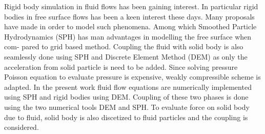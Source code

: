 \begin{Abstract}
Rigid body simulation in fluid flows has been gaining interest. In particular rigid
bodies in free surface flows has been a keen interest these days. Many proposals
have made in order to model such phenomena. Among which Smoothed Particle
Hydrodynamics (SPH) has man advantages in modelling the free surface when com-
pared to grid based method. Coupling the fluid with solid body is also seamlessly
done using SPH and Discrete Element Method (DEM) as only the acceleration from
solid particle is need to be added.
Since solving pressure Poisson equation to evaluate pressure is expensive,
weakly compressible scheme is adapted.
In the present work fluid flow equations are numerically implemented using
SPH and rigid bodies using DEM. Coupling of these two phases is done using the
two numerical tools DEM and SPH. To evaluate force on solid body due to fluid,
solid body is also discetized to fluid particles and the coupling is considered.
%
%
%
%
%
\end{Abstract}
